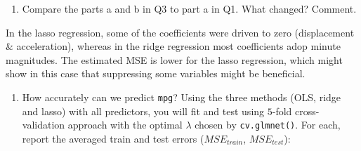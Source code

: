 \documentclass[
]{article}
\providecommand{\tightlist}{%
  \setlength{\itemsep}{0pt}\setlength{\parskip}{0pt}}
\begin{document}
\begin{enumerate}
\def\labelenumi{\alph{enumi}.}
\setcounter{enumi}{2}
\tightlist
\item
  Compare the parts a and b in Q3 to part a in Q1. What changed?
  Comment.
\end{enumerate}

In the lasso regression, some of the coefficients were driven to zero
(displacement \& acceleration), whereas in the ridge regression most
coefficients adop minute magnitudes. The estimated MSE is lower for the
lasso regression, which might show in this case that suppressing some
variables might be beneficial.

\begin{enumerate}
\def\labelenumi{\alph{enumi}.}
\setcounter{enumi}{3}
\tightlist
\item
  How accurately can we predict \texttt{mpg}? Using the three methods
  (OLS, ridge and lasso) with all predictors, you will fit and test
  using \(5\)-fold cross-validation approach with the optimal
  \(\lambda\) chosen by \texttt{cv.glmnet()}. For each, report the
  averaged train and test errors (\(MSE_{train}\), \(MSE_{test}\)):
\end{enumerate}
\end{document}
